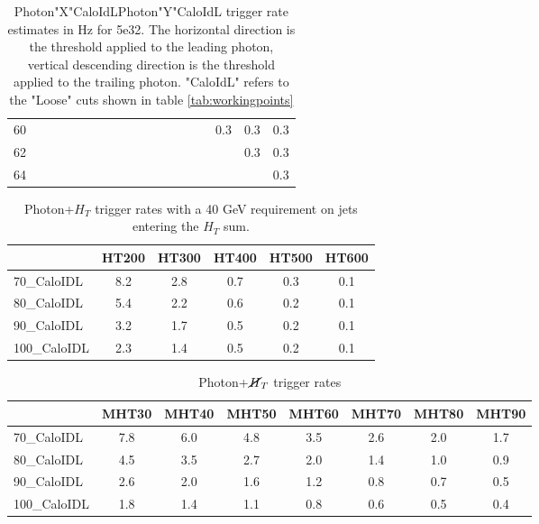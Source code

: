\begin{table}
\begin{center}
\begin{tabular}{|l|ccccccccccccccccc|}
60 &    &    &    &    &    &    &    &    &    &    &    &    &    &    & 0.3   & 0.3   & 0.3  \\
62 &    &    &    &    &    &    &    &    &    &    &    &    &    &    &    & 0.3   &  0.3 \\
64 &    &    &    &    &    &    &    &    &    &    &    &    &    &    &    &    &  0.3  \\ \hline
\end{tabular}
\end{center}
\caption{Photon"X"CaloIdLPhoton"Y"CaloIdL trigger rate estimates in Hz for 5e32.  The horizontal direction is 
the threshold applied to the leading photon, vertical descending direction is the threshold
applied to the trailing photon.  "CaloIdL" refers to the "Loose" cuts shown in table \ref{tab:workingpoints}}
\end{table}





\begin{table}
\begin{center}
\begin{tabular}{|l|ccccc|}\hline
         & HT200 & HT300 & HT400 & HT500 & HT600 \\ \hline \hline
70\_CaloIDL & 8.2 & 2.8 & 0.7 & 0.3 & 0.1  \\
80\_CaloIDL & 5.4 & 2.2 & 0.6 & 0.2 & 0.1 \\
90\_CaloIDL & 3.2 & 1.7 & 0.5 & 0.2 & 0.1 \\
100\_CaloIDL & 2.3 & 1.4 & 0.5 & 0.2 & 0.1 \\ \hline
\end{tabular}
\end{center}
\caption{Photon+$H_T$ trigger rates with a 40 GeV requirement on jets entering the $H_T$ sum.}
\end{table}


\begin{table}
\begin{center}
\begin{tabular}{|l|ccccccc|}\hline
         & MHT30 & MHT40 & MHT50 & MHT60 & MHT70 & MHT80 & MHT90 \\ \hline \hline
70\_CaloIDL  &  7.8 & 6.0 & 4.8 & 3.5 & 2.6 & 2.0 & 1.7 \\
80\_CaloIDL&  4.5 & 3.5 & 2.7 & 2.0 & 1.4 & 1.0& 0.9 \\
90\_CaloIDL & 2.6 & 2.0 & 1.6 & 1.2 & 0.8 & 0.7 & 0.5\\
100\_CaloIDL&  1.8 & 1.4 & 1.1& 0.8 & 0.6 & 0.5 & 0.4  \\ \hline
\end{tabular}
\end{center}
\caption{Photon+$\cancel{H}_T$ trigger rates}
\end{table}